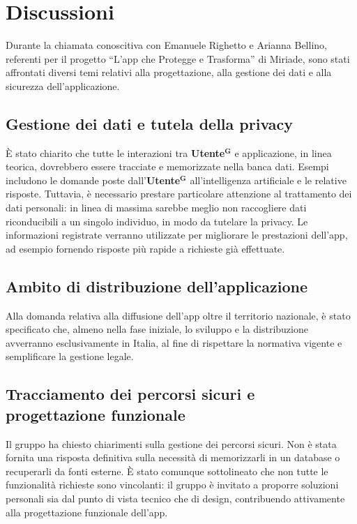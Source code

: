 \documentclass[a4paper,12pt]{article}
\newcommand{\term}[1]{\textbf{#1}$^\mathbf{G}$}
\begin{document}
\section{Discussioni}
Durante la chiamata conoscitiva con Emanuele Righetto e Arianna Bellino, referenti per il progetto “L’app che Protegge e Trasforma” di Miriade, sono stati affrontati diversi temi relativi alla progettazione, alla gestione dei dati e alla sicurezza dell’applicazione.

\subsection{Gestione dei dati e tutela della privacy}
È stato chiarito che tutte le interazioni tra \term{Utente} e applicazione, in linea teorica, dovrebbero essere tracciate e memorizzate nella banca dati.  
Esempi includono le domande poste dall’\term{Utente} all’intelligenza artificiale e le relative risposte. Tuttavia, è necessario prestare particolare attenzione al trattamento dei dati personali: in linea di massima sarebbe meglio non raccogliere dati riconducibili a un singolo individuo, in modo da tutelare la privacy.  
Le informazioni registrate verranno utilizzate per migliorare le prestazioni dell’app, ad esempio fornendo risposte più rapide a richieste già effettuate.

\subsection{Ambito di distribuzione dell’applicazione}
Alla domanda relativa alla diffusione dell’app oltre il territorio nazionale, è stato specificato che, almeno nella fase iniziale, lo sviluppo e la distribuzione avverranno esclusivamente in Italia, al fine di rispettare la normativa vigente e semplificare la gestione legale.

\subsection{Tracciamento dei percorsi sicuri e progettazione funzionale}
Il gruppo ha chiesto chiarimenti sulla gestione dei percorsi sicuri. Non è stata fornita una risposta definitiva sulla necessità di memorizzarli in un database o recuperarli da fonti esterne.  
È stato comunque sottolineato che non tutte le funzionalità richieste sono vincolanti: il gruppo è invitato a proporre soluzioni personali sia dal punto di vista tecnico che di design, contribuendo attivamente alla progettazione funzionale dell’app.
\end{document}
